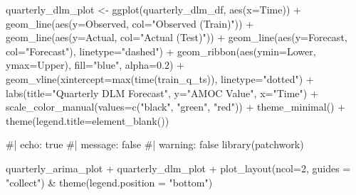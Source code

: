 \documentclass[
  11pt,
]{article}
\newenvironment{Shaded}{\begin{snugshade}}{\end{snugshade}}
\newcommand{\AttributeTok}[1]{\textcolor[rgb]{0.40,0.45,0.13}{#1}}
\newcommand{\CommentTok}[1]{\textcolor[rgb]{0.37,0.37,0.37}{#1}}
\newcommand{\DecValTok}[1]{\textcolor[rgb]{0.68,0.00,0.00}{#1}}
\newcommand{\FloatTok}[1]{\textcolor[rgb]{0.68,0.00,0.00}{#1}}
\newcommand{\FunctionTok}[1]{\textcolor[rgb]{0.28,0.35,0.67}{#1}}
\newcommand{\NormalTok}[1]{\textcolor[rgb]{0.00,0.23,0.31}{#1}}
\newcommand{\OtherTok}[1]{\textcolor[rgb]{0.00,0.23,0.31}{#1}}
\newcommand{\SpecialCharTok}[1]{\textcolor[rgb]{0.37,0.37,0.37}{#1}}
\newcommand{\StringTok}[1]{\textcolor[rgb]{0.13,0.47,0.30}{#1}}
\begin{document}
\begin{Shaded}
\begin{Highlighting}[]
\NormalTok{quarterly\_dlm\_plot }\OtherTok{\textless{}{-}} \FunctionTok{ggplot}\NormalTok{(quarterly\_dlm\_df, }\FunctionTok{aes}\NormalTok{(}\AttributeTok{x=}\NormalTok{Time)) }\SpecialCharTok{+}
  \FunctionTok{geom\_line}\NormalTok{(}\FunctionTok{aes}\NormalTok{(}\AttributeTok{y=}\NormalTok{Observed, }\AttributeTok{col=}\StringTok{"Observed (Train)"}\NormalTok{)) }\SpecialCharTok{+}
  \FunctionTok{geom\_line}\NormalTok{(}\FunctionTok{aes}\NormalTok{(}\AttributeTok{y=}\NormalTok{Actual, }\AttributeTok{col=}\StringTok{"Actual (Test)"}\NormalTok{)) }\SpecialCharTok{+}
  \FunctionTok{geom\_line}\NormalTok{(}\FunctionTok{aes}\NormalTok{(}\AttributeTok{y=}\NormalTok{Forecast, }\AttributeTok{col=}\StringTok{"Forecast"}\NormalTok{), }\AttributeTok{linetype=}\StringTok{"dashed"}\NormalTok{) }\SpecialCharTok{+}
  \FunctionTok{geom\_ribbon}\NormalTok{(}\FunctionTok{aes}\NormalTok{(}\AttributeTok{ymin=}\NormalTok{Lower, }\AttributeTok{ymax=}\NormalTok{Upper), }\AttributeTok{fill=}\StringTok{"blue"}\NormalTok{, }\AttributeTok{alpha=}\FloatTok{0.2}\NormalTok{) }\SpecialCharTok{+}
  \FunctionTok{geom\_vline}\NormalTok{(}\AttributeTok{xintercept=}\FunctionTok{max}\NormalTok{(}\FunctionTok{time}\NormalTok{(train\_q\_ts)), }\AttributeTok{linetype=}\StringTok{"dotted"}\NormalTok{) }\SpecialCharTok{+}
  \FunctionTok{labs}\NormalTok{(}\AttributeTok{title=}\StringTok{"Quarterly DLM Forecast"}\NormalTok{, }\AttributeTok{y=}\StringTok{"AMOC Value"}\NormalTok{, }\AttributeTok{x=}\StringTok{"Time"}\NormalTok{) }\SpecialCharTok{+}
  \FunctionTok{scale\_color\_manual}\NormalTok{(}\AttributeTok{values=}\FunctionTok{c}\NormalTok{(}\StringTok{"black"}\NormalTok{, }\StringTok{"green"}\NormalTok{, }\StringTok{"red"}\NormalTok{)) }\SpecialCharTok{+}
  \FunctionTok{theme\_minimal}\NormalTok{() }\SpecialCharTok{+}
  \FunctionTok{theme}\NormalTok{(}\AttributeTok{legend.title=}\FunctionTok{element\_blank}\NormalTok{())}
\end{Highlighting}
\end{Shaded}

\begin{Shaded}
\begin{Highlighting}[]
\CommentTok{\#| echo: true}
\CommentTok{\#| message: false}
\CommentTok{\#| warning: false}
\FunctionTok{library}\NormalTok{(patchwork)}

\NormalTok{quarterly\_arima\_plot }\SpecialCharTok{+}\NormalTok{ quarterly\_dlm\_plot }\SpecialCharTok{+} 
  \FunctionTok{plot\_layout}\NormalTok{(}\AttributeTok{ncol=}\DecValTok{2}\NormalTok{, }\AttributeTok{guides =} \StringTok{"collect"}\NormalTok{) }\SpecialCharTok{\&} 
  \FunctionTok{theme}\NormalTok{(}\AttributeTok{legend.position =} \StringTok{"bottom"}\NormalTok{)}
\end{Highlighting}
\end{Shaded}
\end{document}
